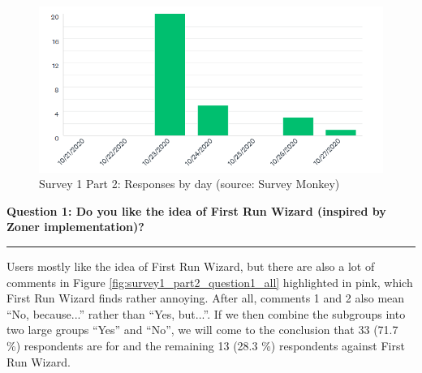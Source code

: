 \documentclass[a4paper,10pt,twoside]{article}
\begin{document}
\vspace{0.3cm}
\begin{figure}[hbt!] 
\begin{center}
\includegraphics[width=15cm]{../surveys/analyzed_data/survey1_part2_insight2.png} 
\caption[Survey 1 Part 2: Responses by day]{Survey 1 Part 2: Responses by day (source: Survey Monkey)}
\label{fig:survey1_part2_insight2}
\end{center}
\end{figure}

\newpage
\noindent \textbf{Question 1: Do you like the idea of First Run Wizard (inspired by Zoner implementation)?}
\par\noindent\rule{\textwidth}{0.4pt}
\noindent Users mostly like the idea of First Run Wizard, but there are also a lot of comments in Figure \ref{fig:survey1_part2_question1_all} highlighted in pink, which First Run Wizard finds rather annoying. After all, comments 1 and 2 also mean ``No, because...'' rather than ``Yes, but...''. If we then combine the subgroups into two large groups ``Yes'' and ``No'', we will come to the conclusion that 33 (71.7 \%) respondents are for and the remaining 13 (28.3 \%) respondents against First Run Wizard.
\end{document}
